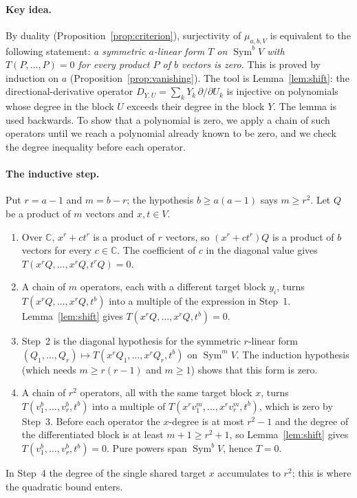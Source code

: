 \documentclass[11pt]{article}
\theoremstyle{definition}
\theoremstyle{remark}
\DeclareMathOperator{\Sym}{Sym}
\newcommand{\C}{\mathbb C}
\newcommand{\D}[2]{D_{#1,#2}}
\begin{document}
\paragraph{Key idea.}
By duality (Proposition~\ref{prop:criterion}), surjectivity of
$\mu_{a,b,V}$ is equivalent to the following statement: \emph{a symmetric
$a$-linear form $T$ on $\Sym^bV$ with $T(P,\ldots,P)=0$ for every product
$P$ of $b$ vectors is zero.} This is proved by induction on $a$
(Proposition~\ref{prop:vanishing}). The tool is
Lemma~\ref{lem:shift}: the directional-derivative operator
$\D YU=\sum_kY_k\,\partial/\partial U_k$ is injective on polynomials whose
degree in the block $U$ exceeds their degree in the block $Y$. The lemma is
used backwards. To show that a polynomial is zero, we apply a chain of such
operators until we reach a polynomial already known to be zero, and we check
the degree inequality before each operator.

\paragraph{The inductive step.}
Put $r=a-1$ and $m=b-r$; the hypothesis $b\ge a(a-1)$ says $m\ge r^2$. Let
$Q$ be a product of $m$ vectors and $x,t\in V$.
\begin{enumerate}[label=\textbf{Step \arabic*.},leftmargin=*,nosep]
\item Over $\C$, $x^r+ct^r$ is a product of $r$ vectors, so
$(x^r+ct^r)Q$ is a product of $b$ vectors for every $c\in\C$. The
coefficient of $c$ in the diagonal value gives
$T(x^rQ,\ldots,x^rQ,t^rQ)=0$.
\item A chain of $m$ operators, each with a different target block $y_i$,
turns $T(x^rQ,\ldots,x^rQ,t^b)$ into a multiple of the expression in Step~1.
Lemma~\ref{lem:shift} gives $T(x^rQ,\ldots,x^rQ,t^b)=0$.
\item Step~2 is the diagonal hypothesis for the symmetric $r$-linear form
$(Q_1,\ldots,Q_r)\mapsto T(x^rQ_1,\ldots,x^rQ_r,t^b)$ on $\Sym^mV$. The
induction hypothesis (which needs $m\ge r(r-1)$ and $m\ge1$) shows that this
form is zero.
\item A chain of $r^2$ operators, all with the same target block $x$, turns
$T(v_1^b,\ldots,v_r^b,t^b)$ into a multiple of
$T(x^rv_1^m,\ldots,x^rv_r^m,t^b)$, which is zero by Step~3. Before each
operator the $x$-degree is at most $r^2-1$ and the degree of the
differentiated block is at least $m+1\ge r^2+1$, so
Lemma~\ref{lem:shift} gives $T(v_1^b,\ldots,v_r^b,t^b)=0$. Pure powers span
$\Sym^bV$, hence $T=0$.
\end{enumerate}
In Step~4 the degree of the single shared target $x$ accumulates to $r^2$;
this is where the quadratic bound enters.
\end{document}
